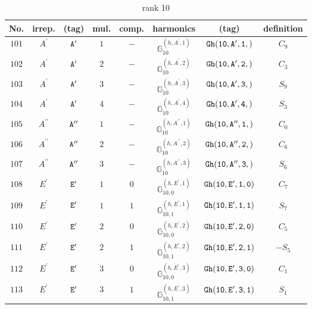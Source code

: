 \documentclass[fleqn,8pt]{jsarticle}
\begin{document}
\begin{table}[ht!]
\begin{center}
\caption{rank 10}
\renewcommand{\arraystretch}{1.3}
\begin{tabular}{cccccccc} \hline \hline
No. & irrep. & (tag) & mul. & comp. & harmonics & (tag) & definition \\ \hline
$ 101 $ & $ A^{\prime} $ & $ {\tt A'} $ & $ 1 $ & $ - $ & $ \mathbb{G}_{10}^{(h,A^{\prime},1)} $ & $ {\tt Gh(10,A',1,)} $ & $ C_{9} $ \\
$ 102 $ & $ A^{\prime} $ & $ {\tt A'} $ & $ 2 $ & $ - $ & $ \mathbb{G}_{10}^{(h,A^{\prime},2)} $ & $ {\tt Gh(10,A',2,)} $ & $ C_{3} $ \\
$ 103 $ & $ A^{\prime} $ & $ {\tt A'} $ & $ 3 $ & $ - $ & $ \mathbb{G}_{10}^{(h,A^{\prime},3)} $ & $ {\tt Gh(10,A',3,)} $ & $ S_{9} $ \\
$ 104 $ & $ A^{\prime} $ & $ {\tt A'} $ & $ 4 $ & $ - $ & $ \mathbb{G}_{10}^{(h,A^{\prime},4)} $ & $ {\tt Gh(10,A',4,)} $ & $ S_{3} $ \\
$ 105 $ & $ A^{\prime\prime} $ & $ {\tt A''} $ & $ 1 $ & $ - $ & $ \mathbb{G}_{10}^{(h,A^{\prime\prime},1)} $ & $ {\tt Gh(10,A'',1,)} $ & $ C_{0} $ \\
$ 106 $ & $ A^{\prime\prime} $ & $ {\tt A''} $ & $ 2 $ & $ - $ & $ \mathbb{G}_{10}^{(h,A^{\prime\prime},2)} $ & $ {\tt Gh(10,A'',2,)} $ & $ C_{6} $ \\
$ 107 $ & $ A^{\prime\prime} $ & $ {\tt A''} $ & $ 3 $ & $ - $ & $ \mathbb{G}_{10}^{(h,A^{\prime\prime},3)} $ & $ {\tt Gh(10,A'',3,)} $ & $ S_{6} $ \\
$ 108 $ & $ E^{\prime} $ & $ {\tt E'} $ & $ 1 $ & $ 0 $ & $ \mathbb{G}_{10,0}^{(h,E^{\prime},1)} $ & $ {\tt Gh(10,E',1,0)} $ & $ C_{7} $ \\
$ 109 $ & $ E^{\prime} $ & $ {\tt E'} $ & $ 1 $ & $ 1 $ & $ \mathbb{G}_{10,1}^{(h,E^{\prime},1)} $ & $ {\tt Gh(10,E',1,1)} $ & $ S_{7} $ \\
$ 110 $ & $ E^{\prime} $ & $ {\tt E'} $ & $ 2 $ & $ 0 $ & $ \mathbb{G}_{10,0}^{(h,E^{\prime},2)} $ & $ {\tt Gh(10,E',2,0)} $ & $ C_{5} $ \\
$ 111 $ & $ E^{\prime} $ & $ {\tt E'} $ & $ 2 $ & $ 1 $ & $ \mathbb{G}_{10,1}^{(h,E^{\prime},2)} $ & $ {\tt Gh(10,E',2,1)} $ & $ - S_{5} $ \\
$ 112 $ & $ E^{\prime} $ & $ {\tt E'} $ & $ 3 $ & $ 0 $ & $ \mathbb{G}_{10,0}^{(h,E^{\prime},3)} $ & $ {\tt Gh(10,E',3,0)} $ & $ C_{1} $ \\
$ 113 $ & $ E^{\prime} $ & $ {\tt E'} $ & $ 3 $ & $ 1 $ & $ \mathbb{G}_{10,1}^{(h,E^{\prime},3)} $ & $ {\tt Gh(10,E',3,1)} $ & $ S_{1} $ \\

\end{tabular}
\end{center}
\end{table}
\end{document}
